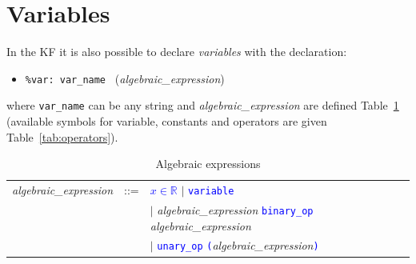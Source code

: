 \documentclass[11pt]{book}
\def\tcb#1{\textcolor{blue}{\ttt{#1}}}
\def\ttt#1{\texttt{#1}}
\def\var#1{{\textquotesingle}#1{\textquotesingle}}
\def\ITE#1{\begin{itemize}#1\end{itemize}}
\def\Real{\mathbb R}
\begin{document}
\section{Variables}\label{sec:var}

In the KF it is also possible to declare \emph{variables} with the declaration:
\ITE{
\item[] \ttt{\%var: \var{var\_name}~} (\textit{algebraic\_expression})
}
where \ttt{var\_name} can be any string and \textit{algebraic\_expression} are defined Table~\ref{tab:alg} (available symbols for variable, constants and operators are given Table~\ref{tab:operators}).

\begin{table}[htbp]
  \centering
  \caption{Algebraic expressions}
  \begin{tabular}{@{} lcl @{}}
    \textit{algebraic\_expression} & ::= & \tcb{$x\in\Real$} $\mid$ \tcb{variable} \\
     &  & $\mid$ \textit{algebraic\_expression} \tcb{binary\_op} \textit{algebraic\_expression}\\
     &  & $\mid$ \tcb{unary\_op} \tcb{(}\textit{algebraic\_expression}\tcb{)} \\
    \end{tabular}
  \label{tab:alg}
\end{table}
\end{document}
